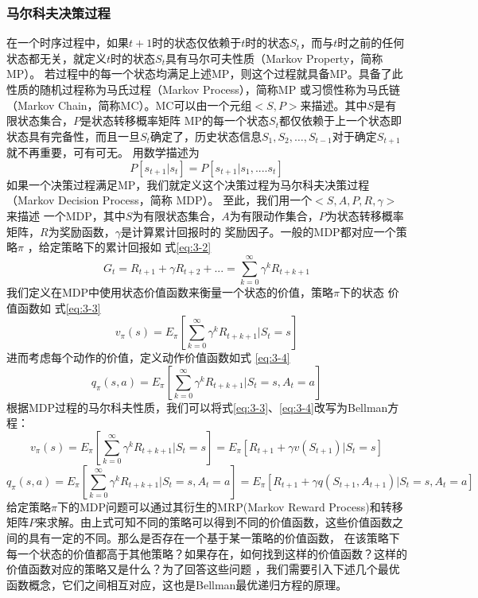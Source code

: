 \subsubsection{马尔科夫决策过程}
在一个时序过程中，如果$t+1$时的状态仅依赖于$t$时的状态$S_t$，而与$t$时之前的任何状态都无关，就定义$t$时的状态$S_t$具有马尔可夫性质（Markov Property，简称MP）。
若过程中的每一个状态均满足上述MP，则这个过程就具备MP。具备了此性质的随机过程称为马氏过程（Markov Process），简称MP
或习惯性称为马氏链（Markov Chain，简称MC）。MC可以由一个元组$<S,P>$来描述。其中$S$是有限状态集合，$P$是状态转移概率矩阵
MP的每一个状态$S_t$都仅依赖于上一个状态即状态具有完备性，而且一旦$S_t$确定了，历史状态信息$S_1,S_2,…,S_{t-1}$对于确定$S_{t+1}$就不再重要，可有可无。
用数学描述为
\begin{equation}
  P[s_{t+1}|s_t]=P[s_{t+1}|s_1,....s_t]
  \label{eq:3-1}
\end{equation}
如果一个决策过程满足MP，我们就定义这个决策过程为马尔科夫决策过程（Markov Decision Process，简称 MDP）。
至此，我们用一个$<S,A,P,R,\gamma >$来描述
一个MDP，其中$S$为有限状态集合，$A$为有限动作集合，$P$为状态转移概率矩阵，$R$为奖励函数，$\gamma $是计算累计回报时的
奖励因子。一般的MDP都对应一个策略$\pi$ ，给定策略下的累计回报如 式\eqref{eq:3-2}
\begin{equation}
  G_t=R_{t+1}+\gamma R_{t+2}+...=\sum_{k = 0}^{\infty} \gamma ^kR_{t+k+1} 
  \label{eq:3-2}
\end{equation}
我们定义在MDP中使用状态价值函数来衡量一个状态的价值，策略$\pi$下的状态
价值函数如 式\eqref{eq:3-3}
\begin{equation}
  v_\pi (s)=E_\pi [\sum_{k = 0}^{\infty}\gamma ^kR_{t+k+1}|S_t=s ]
  \label{eq:3-3}
\end{equation}
进而考虑每个动作的价值，定义动作价值函数如式 \eqref{eq:3-4}
\begin{equation}
  q_\pi (s,a)=E_\pi [\sum_{k = 0}^{\infty}\gamma ^kR_{t+k+1}|S_t=s,A_t=a ]
  \label{eq:3-4}
\end{equation}
根据MDP过程的马尔科夫性质，我们可以将式\eqref{eq:3-3}、\eqref{eq:3-4}改写为Bellman方程：
\begin{equation}
  v_\pi (s)=E_\pi [\sum_{k = 0}^{\infty}\gamma ^kR_{t+k+1}|S_t=s ]
  =E_\pi [R_{t+1}+\gamma v(S_{t+1})|S_t=s]
  \label{eq:3-5}
\end{equation}
\begin{equation}
  q_\pi (s,a)=E_\pi [\sum_{k = 0}^{\infty}\gamma ^kR_{t+k+1}|S_t=s,A_t=a ]
  =E_\pi [R_{t+1}+\gamma q(S_{t+1},A_{t+1})|S_t=s,A_t=a]
  \label{eq:3-6}
\end{equation}
给定策略$\pi $下的MDP问题可以通过其衍生的MRP(Markov Reward Process)和转移矩阵$P$来求解。由上式可知不同的策略可以得到不同的价值函数，这些价值函数之间的具有一定的不同。那么是否存在一个基于某一策略的价值函数，
在该策略下每一个状态的价值都高于其他策略？如果存在，如何找到这样的价值函数？这样的价值函数对应的策略又是什么？为了回答这些问题
，我们需要引入下述几个最优函数概念，它们之间相互对应，这也是Bellman最优递归方程的原理。

